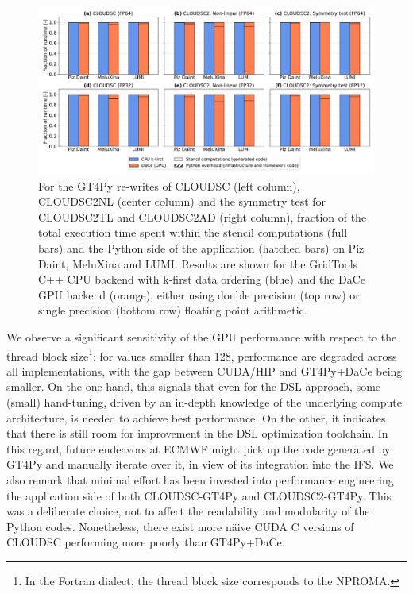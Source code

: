 \documentclass[main.tex]{subfiles}
\begin{document}
     \begin{figure}[t!]
        \centering
        \includegraphics[scale=0.44]{img/runtime_fraction_1.pdf}
        \caption{For the GT4Py re-writes of CLOUDSC (left column), CLOUDSC2NL (center column) and the symmetry test for CLOUDSC2TL and CLOUDSC2AD (right column), fraction of the total execution time spent within the stencil computations (full bars) and the Python side of the application (hatched bars) on Piz Daint, MeluXina and LUMI. Results are shown for the GridTools C++ CPU backend with k-first data ordering (blue) and the DaCe GPU backend (orange), either using double precision (top row) or single precision (bottom row) floating point arithmetic.}
        \label{fig:runtime-fraction}
    \end{figure}

    We observe a significant sensitivity of the GPU performance with respect to the thread block size\footnote{In the Fortran dialect, the thread block size corresponds to the NPROMA.}: for values smaller than 128, performance are degraded across all implementations, with the gap between CUDA/HIP and GT4Py+DaCe being smaller. On the one hand, this signals that even for the DSL approach, some (small) hand-tuning, driven by an in-depth knowledge of the underlying compute architecture, is needed to achieve best performance. On the other, it indicates that there is still room for improvement in the DSL optimization toolchain. In this regard, future endeavors at ECMWF might pick up the code generated by GT4Py and manually iterate over it, in view of its integration into the IFS. We also remark that minimal effort has been invested into performance engineering the application side of both CLOUDSC-GT4Py and CLOUDSC2-GT4Py. This was a deliberate choice, not to affect the readability and modularity of the Python codes. Nonetheless, there exist more n\"aive CUDA C versions of CLOUDSC performing more poorly than GT4Py+DaCe.
\end{document}
